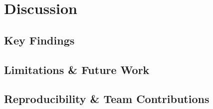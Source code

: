 \documentclass[11pt,a4paper]{article}
\begin{document}

\section{Discussion}
\label{sec:discussion}


\subsection{Key Findings}

\subsection{Limitations \& Future Work}

\subsection{Reproducibility \& Team Contributions}
\end{document}
